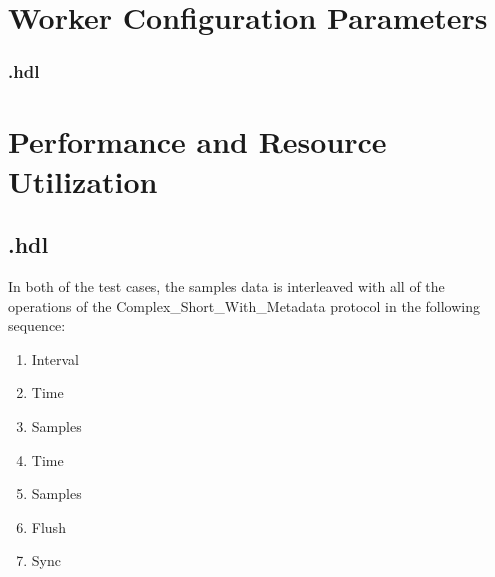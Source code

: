 \begin{landscape}
\section*{Worker Configuration Parameters}
\subsubsection*{\comp.hdl}
%
\section*{Performance and Resource Utilization}
\subsection*{\comp.hdl}
%
\end{landscape}
\newpage


\medskip
In both of the test cases, the samples data is interleaved with all of the operations of the Complex\_Short\_With\_Metadata protocol in the following sequence:

\begin{enumerate}
	\item Interval
	\item Time
	\item Samples
	\item Time	
	\item Samples
	\item Flush
	\item Sync
\end{enumerate}




